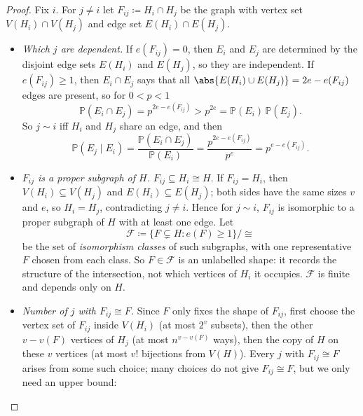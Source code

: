 \begin{proof}
    Fix \(i\). For \(j \ne i\) let \(F_{ij} \coloneqq H_i \cap H_j\) be the graph with vertex set \(V(H_i) \cap V(H_j)\) and edge set \(E(H_i) \cap E(H_j)\).
    \begin{center}
    \end{center}
    \begin{itemize}
        \item \emph{Which \(j\) are dependent.} If \(e(F_{ij}) = 0\), then \(E_i\) and \(E_j\) are determined by the disjoint edge sets \(E(H_i)\) and \(E(H_j)\), so they are independent. If \(e(F_{ij}) \ge 1\), then \(E_i \cap E_j\) says that all \(\abs{E(H_i) \cup E(H_j)} = 2e - e(F_{ij})\) edges are present, so for \(0 < p < 1\)
        \[
            \mathbb{P}(E_i \cap E_j) = p^{2e - e(F_{ij})} > p^{2e} = \mathbb{P}(E_i)\,\mathbb{P}(E_j).
        \]
        So \(j \sim i\) iff \(H_i\) and \(H_j\) share an edge, and then
        \begin{equation}\label{eq:subgraph-cond-prob}
            \mathbb{P}(E_j \mid E_i) = \frac{\mathbb{P}(E_i \cap E_j)}{\mathbb{P}(E_i)} = \frac{p^{2e - e(F_{ij})}}{p^{e}} = p^{e - e(F_{ij})}.
        \end{equation}
        \item \emph{\(F_{ij}\) is a proper subgraph of \(H\).} \(F_{ij} \subseteq H_i \cong H\). If \(F_{ij} = H_i\), then \(V(H_i) \subseteq V(H_j)\) and \(E(H_i) \subseteq E(H_j)\); both sides have the same sizes \(v\) and \(e\), so \(H_i = H_j\), contradicting \(j \ne i\). Hence for \(j \sim i\), \(F_{ij}\) is isomorphic to a proper subgraph of \(H\) with at least one edge. Let
        \[
            \mathcal{F} \coloneqq \bigl\{ F \subsetneq H : e(F) \ge 1 \bigr\} \big/ \cong
        \]
        be the set of \emph{isomorphism classes} of such subgraphs, with one representative \(F\) chosen from each class. So \(F \in \mathcal{F}\) is an unlabelled shape: it records the structure of the intersection, not which vertices of \(H_i\) it occupies. \(\mathcal{F}\) is finite and depends only on \(H\).
        \item \emph{Number of \(j\) with \(F_{ij} \cong F\).} Since \(F\) only fixes the shape of \(F_{ij}\), first choose the vertex set of \(F_{ij}\) inside \(V(H_i)\) (at most \(2^{v}\) subsets), then the other \(v - v(F)\) vertices of \(H_j\) (at most \(n^{v - v(F)}\) ways), then the copy of \(H\) on these \(v\) vertices (at most \(v!\) bijections from \(V(H)\)). Every \(j\) with \(F_{ij} \cong F\) arises from some such choice; many choices do not give \(F_{ij} \cong F\), but we only need an upper bound:

\end{itemize}
\end{proof}
